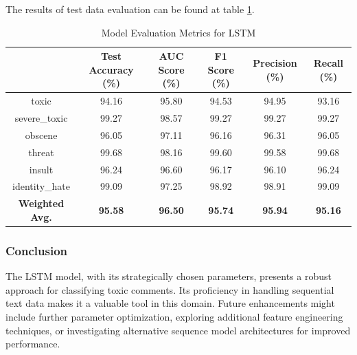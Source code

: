 The results of test data evaluation can be found at table \ref{tab:model_metrics_lstm}.

\begin{table}[h]
\centering
\begin{tabular}{|c|c|c|c|c|c|}
\hline
 & Test Accuracy (\%) & AUC Score (\%) & F1 Score (\%) & Precision (\%) & Recall (\%) \\
\hline
toxic & 94.16 & 95.80 & 94.53 & 94.95 & 93.16 \\
severe\_toxic & 99.27 & 98.57 & 99.27 & 99.27 & 99.27 \\
obscene & 96.05 & 97.11 & 96.16 & 96.31 & 96.05 \\
threat & 99.68 & 98.16 & 99.60 & 99.58 & 99.68 \\
insult & 96.24 & 96.60 & 96.17 & 96.10 & 96.24 \\
identity\_hate & 99.09 & 97.25 & 98.92 & 98.91 & 99.09 \\
\hline
\textbf{Weighted Avg.} & \textbf{95.58} & \textbf{96.50} & \textbf{95.74} & \textbf{95.94} & \textbf{95.16} \\
\hline
\end{tabular}
\caption{Model Evaluation Metrics for LSTM}
\label{tab:model_metrics_lstm}
\end{table}



\subsubsection{Conclusion}
The LSTM model, with its strategically chosen parameters, presents a robust approach for classifying toxic comments. Its proficiency in handling sequential text data makes it a valuable tool in this domain. Future enhancements might include further parameter optimization, exploring additional feature engineering techniques, or investigating alternative sequence model architectures for improved performance.
